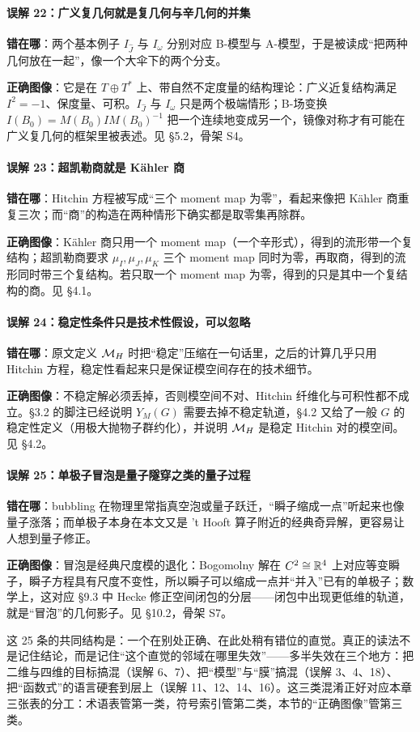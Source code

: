 \paragraph{误解 22：广义复几何就是复几何与辛几何的并集}
\mbox{}\par\noindent
\textbf{错在哪}：两个基本例子 $I_{\hat J}$ 与 $I_\omega$ 分别对应 B-模型与 A-模型，于是被读成“把两种几何放在一起”，像一个大伞下的两个分支。
\par\noindent
\textbf{正确图像}：它是在 $T\oplus T^*$ 上、带自然不定度量的结构理论：广义近复结构满足 $I^2=-1$、保度量、可积。$I_{\hat J}$ 与 $I_\omega$ 只是两个极端情形；B-场变换 $I(B_0)=M(B_0)IM(B_0)^{-1}$ 把一个连续地变成另一个，镜像对称才有可能在广义复几何的框架里被表述。见 \S5.2，骨架 S4。

\paragraph{误解 23：超凯勒商就是 Kähler 商}
\mbox{}\par\noindent
\textbf{错在哪}：Hitchin 方程被写成“三个 moment map 为零”，看起来像把 Kähler 商重复三次；而“商”的构造在两种情形下确实都是取零集再除群。
\par\noindent
\textbf{正确图像}：Kähler 商只用一个 moment map（一个辛形式），得到的流形带一个复结构；超凯勒商要求 $\mu_I,\mu_J,\mu_K$ 三个 moment map 同时为零，再取商，得到的流形同时带三个复结构。若只取一个 moment map 为零，得到的只是其中一个复结构的商。见 \S4.1。

\paragraph{误解 24：稳定性条件只是技术性假设，可以忽略}
\mbox{}\par\noindent
\textbf{错在哪}：原文定义 $\mathcal{M}_H$ 时把“稳定”压缩在一句话里，之后的计算几乎只用 Hitchin 方程，稳定性看起来只是保证模空间存在的技术细节。
\par\noindent
\textbf{正确图像}：不稳定解必须丢掉，否则模空间不对、Hitchin 纤维化与可积性都不成立。\S3.2 的脚注已经说明 $Y_M(G)$ 需要去掉不稳定轨道，\S4.2 又给了一般 $G$ 的稳定性定义（用极大抛物子群约化），并说明 $\mathcal{M}_H$ 是稳定 Hitchin 对的模空间。见 \S4.2。

\paragraph{误解 25：单极子冒泡是量子隧穿之类的量子过程}
\mbox{}\par\noindent
\textbf{错在哪}：bubbling 在物理里常指真空泡或量子跃迁，“瞬子缩成一点”听起来也像量子涨落；而单极子本身在本文又是 't Hooft 算子附近的经典奇异解，更容易让人想到量子修正。
\par\noindent
\textbf{正确图像}：冒泡是经典尺度模的退化：Bogomolny 解在 $C^2\cong\mathbb{R}^4$ 上对应等变瞬子，瞬子方程具有尺度不变性，所以瞬子可以缩成一点并“并入”已有的单极子；数学上，这对应 \S9.3 中 Hecke 修正空间闭包的分层——闭包中出现更低维的轨道，就是“冒泡”的几何影子。见 \S10.2，骨架 S7。

\vspace{1ex}
\noindent 这 25 条的共同结构是：一个在别处正确、在此处稍有错位的直觉。真正的读法不是记住结论，而是记住“这个直觉的邻域在哪里失效”——多半失效在三个地方：把二维与四维的目标搞混（误解 6、7）、把“模型”与“膜”搞混（误解 3、4、18）、把“函数式”的语言硬套到层上（误解 11、12、14、16）。这三类混淆正好对应本章三张表的分工：术语表管第一类，符号索引管第二类，本节的“正确图像”管第三类。

